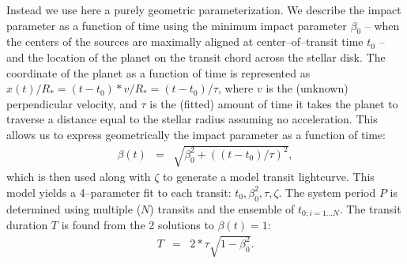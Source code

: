 
Instead we use here a purely geometric parameterization.
We describe the impact parameter as a function of time using the
minimum impact parameter $\beta_0$ -- when the centers of the sources
are maximally aligned at center--of--transit time $t_0$ -- and the
location of the planet on the transit chord across the stellar disk.
The coordinate of the planet as a function of time is represented as
$x(t) / R_* = (t - t_0) * v / R_* = (t - t_0) / \tau$, where $v$ is
the (unknown) perpendicular velocity, and $\tau$ is the (fitted)
amount of time it takes the planet to traverse a distance equal to the
stellar radius assuming no acceleration.  This allows us to express
geometrically the impact parameter as a function of time:
\begin{eqnarray}
\beta(t) & = & \sqrt{\beta_0^2 + \left((t - t_0) / \tau\right)^2},
\end{eqnarray}
which is then used along with $\zeta$ to generate a model transit
lightcurve.
This model yields a 4--parameter fit to each transit: $t_0, \beta_0^2,
\tau, \zeta$.  The system period $P$ is determined using 
multiple ($N$) transits and the ensemble of $t_{0;i=1...N}$.  The
transit duration $T$ is found from the 2 solutions to $\beta(t) = 1$:
\begin{eqnarray}
T & = & 2 * \tau \sqrt{1 - \beta_0^2}.
\label{eq-dt}
\end{eqnarray}

